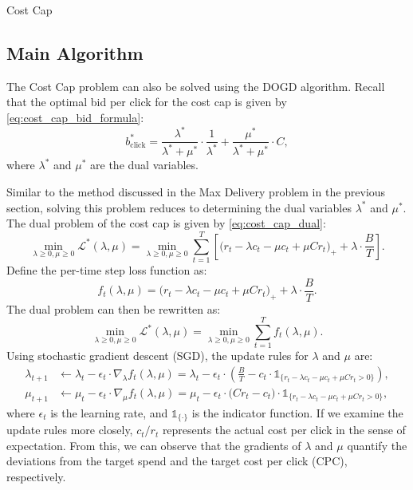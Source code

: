 \documentclass[../main.tex]{subfiles}
\begin{document}
	\begin{section}{Cost Cap}
		\subsection*{Main Algorithm}
		The Cost Cap problem can also be solved using the DOGD algorithm. Recall that the optimal bid per click for the cost cap is given by \autoref{eq:cost_cap_bid_formula}:
		\begin{equation*}
			b^*_{\text{click}} = \frac{\lambda^*}{\lambda^* + \mu^*} \cdot \frac{1}{\lambda^*} + \frac{\mu^*}{\lambda^* + \mu^*} \cdot C,
		\end{equation*}
		where \(\lambda^*\) and \(\mu^*\) are the dual variables. 
		
		Similar to the method discussed in the Max Delivery problem in the previous section, solving this problem reduces to determining the dual variables \(\lambda^*\) and \(\mu^*\). The dual problem of the cost cap is given by \autoref{eq:cost_cap_dual}:
		\begin{equation*}
			\min_{\lambda \geq 0, \mu \geq 0} \mathcal{L}^*(\lambda, \mu) = \min_{\lambda \geq 0, \mu \geq 0} \sum_{t=1}^{T} \left[ \big(r_t - \lambda c_t - \mu c_t + \mu C r_t\big)_{+} + \lambda \cdot \frac{B}{T} \right].
		\end{equation*}
		Define the per-time step loss function as:
		\[
		f_t(\lambda, \mu) = \big(r_t - \lambda c_t - \mu c_t + \mu C r_t\big)_{+} + \lambda \cdot \frac{B}{T}.
		\]
		The dual problem can then be rewritten as:
		\[
		\min_{\lambda \geq 0, \mu \geq 0} \mathcal{L}^*(\lambda, \mu) = \min_{\lambda \geq 0, \mu \geq 0} \sum_{t=1}^{T} f_t(\lambda, \mu).
		\]
		Using stochastic gradient descent (SGD), the update rules for \(\lambda\) and \(\mu\) are:
		\begin{equation*}
			\begin{aligned}
				\lambda_{t+1} &  \gets  \lambda_t - \epsilon_t \cdot \nabla_\lambda f_t(\lambda, \mu)= \lambda_t - \epsilon_t \cdot \left( \frac{B}{T} - c_t \cdot \mathds{1}_{\{r_t - \lambda c_t - \mu c_t + \mu C r_t > 0\}} \right), \\
				\mu_{t+1} & \gets  \mu_t - \epsilon_t \cdot \nabla_\mu f_t(\lambda, \mu)=  \mu_t - \epsilon_t \cdot \big(C r_t - c_t\big) \cdot \mathds{1}_{\{r_t - \lambda c_t - \mu c_t + \mu C r_t > 0\}},
			\end{aligned}
		\end{equation*}
		where \(\epsilon_t\) is the learning rate, and \(\mathds{1}_{\{\cdot\}}\) is the indicator function. If we examine the update rules more closely, \(c_t / r_t\) represents the actual cost per click in the sense of expectation. From this, we can observe that the gradients of \(\lambda\) and \(\mu\) quantify the deviations from the target spend and the target cost per click (CPC), respectively. 
		

\end{section}
\end{document}
